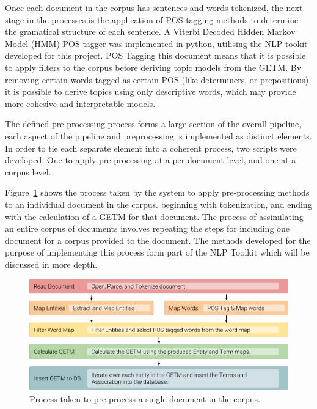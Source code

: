 \documentclass[10pt]{report}
\begin{document}
Once each document in the corpus has sentences and words tokenized, the next stage in the processes is the application of POS tagging methods to determine the gramatical structure of each sentence. A Viterbi Decoded Hidden Markov Model (HMM) POS tagger was implemented in python, utilising the NLP tookit developed for this project. POS Tagging this document means that it is possible to apply filters to the corpus before deriving topic models from the GETM. By removing certain words tagged as certain POS (like determiners, or prepositions) it is possible to derive topics using only descriptive words, which may provide more cohesive and interpretable models.

The defined pre-processing process forms a large section of the overall pipeline, each aspect of the pipeline and preprocessing is implemented as distinct elements. In order to tie each separate element into a coherent process, two scripts were developed. One to apply pre-processing at a per-document level, and one at a corpus level.

Figure~\ref{fig:document_preprocess} shows the process taken by the system to apply pre-processing methods to an individual document in the corpus. beginning with tokenization, and ending with the calculation of a GETM for that document. The process of assimilating an entire corpus of documents involves repeating the steps for including one document for a corpus provided to the document. The methods developed for the purpose of implementing this process form part of the NLP Toolkit which will be discussed in more depth.

\begin{figure}[h!]
  \centering
  \includegraphics[scale=0.6]{per_document_process}
  \caption{Process taken to pre-process a single document in the corpus.\label{fig:document_preprocess}}
\end{figure}
\end{document}
